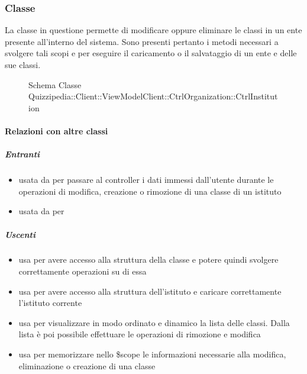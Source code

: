 \subsubsection{Classe }
La classe in questione permette di modificare oppure eliminare le classi in un ente presente all'interno del sistema.
Sono presenti pertanto i metodi necessari a svolgere tali scopi e per eseguire il caricamento o il salvataggio di un ente e delle sue classi.
\begin{figure}[H]
\centering
\noindent{}
\caption[Schema Classe CtrlInstitution]{Schema Classe Quizzipedia::Client::ViewModelClient::CtrlOrganization::CtrlInstitution}
\end{figure}
\paragraph{Relazioni con altre classi}
\subparagraph{Entranti}
\begin{itemize}
\item usata da  per passare al controller i dati immessi dall'utente durante le operazioni di modifica, creazione o rimozione di una classe di un istituto
\item usata da  per 
\end{itemize}
\subparagraph{Uscenti}
\begin{itemize}
\item usa  per avere
accesso alla struttura della classe e potere quindi svolgere correttamente operazioni su di
essa
\item usa  per avere accesso alla struttura dell'istituto e caricare correttamente l'istituto corrente
\item usa  per visualizzare in modo ordinato e dinamico la lista delle classi. Dalla lista è poi possibile effettuare le operazioni di rimozione e modifica
\item usa  per memorizzare nello \$scope le informazioni necessarie alla modifica, eliminazione o creazione di una classe
\end{itemize}
